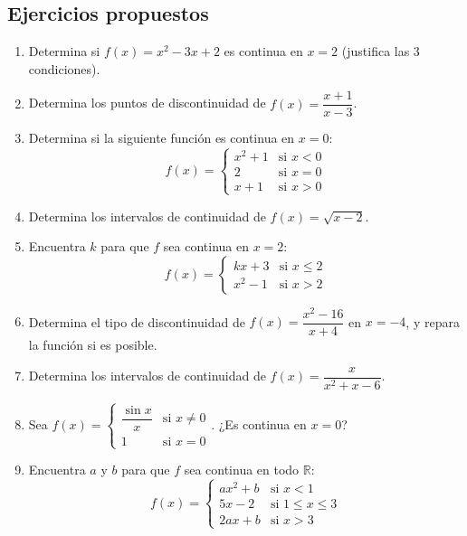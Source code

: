 \documentclass[12pt, letterpaper]{article}
\begin{document}
\subsection{Ejercicios propuestos}

\begin{enumerate}[resume=ejercicios, leftmargin=*]
  \item \facil{} Determina si $f(x) = x^2 - 3x + 2$ es continua en $x = 2$ (justifica las 3 condiciones).

  \item \facil{} Determina los puntos de discontinuidad de $f(x) = \dfrac{x + 1}{x - 3}$.

  \item \facil{} Determina si la siguiente función es continua en $x = 0$:
        $$f(x) = \begin{cases} x^2 + 1 & \text{si } x < 0 \\ 2 & \text{si } x = 0 \\ x + 1 & \text{si } x > 0 \end{cases}$$

  \item \facil{} Determina los intervalos de continuidad de $f(x) = \sqrt{x - 2}$.

  \item \medio{} Encuentra $k$ para que $f$ sea continua en $x = 2$:
        $$f(x) = \begin{cases} kx + 3 & \text{si } x \le 2 \\ x^2 - 1 & \text{si } x > 2 \end{cases}$$

  \item \medio{} Determina el tipo de discontinuidad de $f(x) = \dfrac{x^2 - 16}{x + 4}$ en $x = -4$, y repara la función si es posible.

  \item \medio{} Determina los intervalos de continuidad de $f(x) = \dfrac{x}{x^2 + x - 6}$.

  \item \medio{} Sea $f(x) = \begin{cases} \dfrac{\sin x}{x} & \text{si } x \neq 0 \\ 1 & \text{si } x = 0 \end{cases}$. ¿Es continua en $x = 0$?

  \item \dificil{} Encuentra $a$ y $b$ para que $f$ sea continua en todo $\mathbb{R}$:
        $$f(x) = \begin{cases} ax^2 + b & \text{si } x < 1 \\ 5x - 2 & \text{si } 1 \le x \le 3 \\ 2a x + b & \text{si } x > 3 \end{cases}$$


\end{enumerate}
\end{document}
